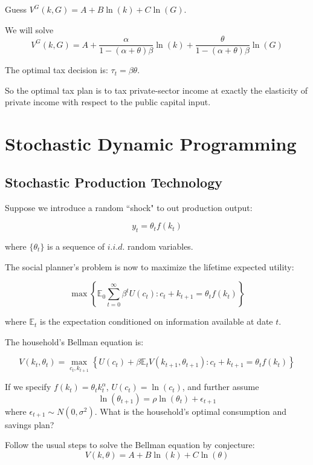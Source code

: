 \documentclass[10pt,a4]{article}
\begin{document}
Guess $V^G(k,G) = A + B\ln(k) + C\ln(G)$. 

We will solve 
$$ V^G(k,G) = A + \frac{\alpha}{1-(\alpha+\theta)\beta}\ln(k) + \frac{\theta}{1-(\alpha+\theta)\beta}\ln(G) $$

The optimal tax decision is: $\tau_t = \beta\theta$.

So the optimal tax plan is to tax private-sector income at exactly the
elasticity of private income with respect to the public capital input.

\par\null

\section{Stochastic Dynamic
Programming}

{\label{704756}}

\subsection{Stochastic Production
Technology}

{\label{991631}}

Suppose we introduce a random ``shock" to out production output:

$$ y_t = \theta_t f(k_t) $$

where $\{\theta_t\}$ is a sequence of $i.i.d.$ random variables.

The social planner's problem is now to maximize the lifetime expected utility:

$$\max\left\{ \mathbb{E}_0 \sum_{t=0}^{\infty} \beta^t U(c_t): c_t + k_{t+1} = \theta_t f(k_t) \right\}$$

where $\mathbb{E}_t$ is the expectation conditioned on information available at date $t$.



The household's Bellman equation is:

$$ V(k_t, \theta_t) = \max_{c_t, k_{t+1}} \left\{U(c_t) + \beta\mathbb{E}_t V(k_{t+1}, \theta_{t+1}): c_t + k_{t+1} = \theta_t f(k_t) \right\}$$



If we specify $f(k_t) = \theta_t k_t^{\alpha}$, $U(c_t) = \ln(c_t)$, and further assume $$\ln(\theta_{t+1}) = \rho\ln(\theta_t) + \epsilon_{t+1} $$
where $\epsilon_{t+1}\sim N(0,\sigma^2)$. 
What is the household's optimal consumption and savings plan?

Follow the usual steps to solve the Bellman equation by conjecture:
$$ V(k, \theta) = A + B\ln(k) + C\ln(\theta) $$
\end{document}

